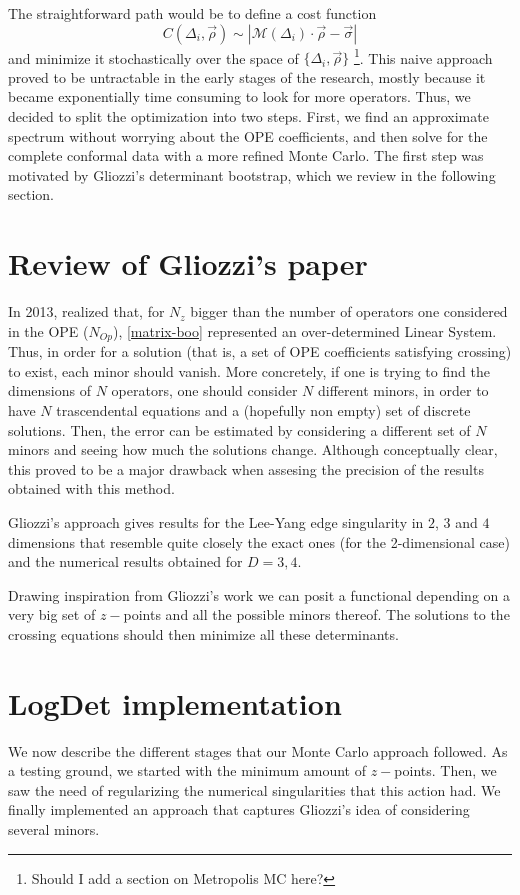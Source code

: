 \documentclass[letterpaper]{article}
\numberwithin{equation}{section}
\begin{document}
The straightforward path would be to define a cost function
\[
  C(\Delta_i,\vec\rho)\sim | \mathcal{M}(\Delta_i)\cdot \vec{\rho} - \vec{\sigma} |
\]
and minimize it stochastically over the space of $\{\Delta_i,\vec\rho\}$ \footnote{Should I add a section on Metropolis MC
here?}.
This naive approach proved to be untractable in the early stages of the
research, mostly because it became exponentially time consuming to look for more
operators. Thus, we decided to split the optimization into two steps. First, we
find an approximate spectrum without worrying about the OPE coefficients, and
then solve for the complete conformal data with a more refined Monte Carlo.
The first step was motivated by Gliozzi's determinant bootstrap, which we review
in the following section.

\section{Review of Gliozzi's paper}
In 2013, \cite{Gliozzi:2013ysa} realized that, for $N_z$ bigger than the number of operators
one considered in the OPE ($N_{Op}$), \ref{matrix-boo} represented an over-determined
Linear System. Thus, in order for a solution (that is, a set of OPE coefficients
satisfying crossing) to exist, each minor should vanish. More concretely, if one
is trying to find the dimensions of $N$ operators, one should consider $N$
different minors, in order to have $N$ trascendental equations and a (hopefully
non empty)
set of discrete solutions. Then, the error can be estimated by considering a
different set of $N$ minors and seeing how much the solutions change. Although
conceptually clear, this proved to be a major drawback when assesing the
precision of the results obtained with this method.

Gliozzi's approach gives results for the Lee-Yang edge singularity in $2$, $3$
and $4$
dimensions that resemble quite closely the exact ones (for the 2-dimensional
case) and the numerical results obtained for $D=3,4$.

Drawing inspiration from Gliozzi's work we can posit a functional depending on a
very big set of $z-$points and all the possible minors thereof. The solutions to
the crossing equations should then minimize all these determinants.


\section{LogDet implementation}
We now describe the different stages that our Monte Carlo approach followed.
As a testing ground, we started with the minimum amount of $z-$points. Then, we
saw the need of regularizing the numerical singularities that this action had.
We finally implemented an approach that captures Gliozzi's idea of considering
several minors.
\end{document}
